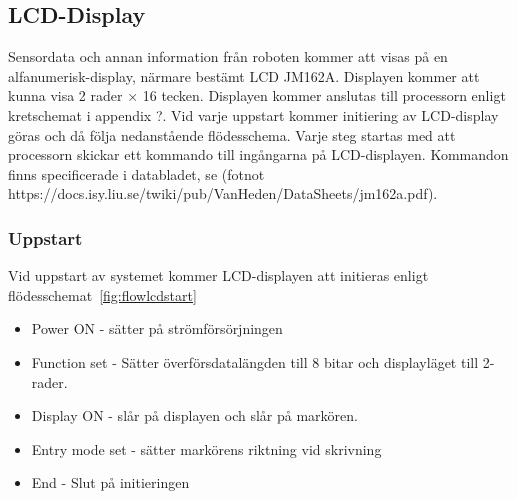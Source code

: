 \documentclass[a4paper,12pt,fleqn]{article}
\begin{document}
\subsection{LCD-Display}
Sensordata och annan information från roboten kommer att visas på en alfanumerisk-display, närmare bestämt  LCD JM162A. Displayen kommer att kunna visa 2 rader × 16 tecken.
Displayen kommer anslutas till processorn enligt kretschemat i appendix ?. 
Vid varje uppstart kommer initiering av LCD-display göras och då följa nedanstående flödesschema. Varje steg startas med att processorn skickar ett kommando till ingångarna på LCD-displayen. Kommandon finns specificerade i databladet, se (fotnot https://docs.isy.liu.se/twiki/pub/VanHeden/DataSheets/jm162a.pdf). 

\subsubsection{Uppstart}
	
Vid uppstart av systemet kommer LCD-displayen att initieras enligt flödes\-schemat~\ref{fig:flowlcdstart}

\begin{itemize}
  \item Power ON - sätter på strömförsörjningen
  \item Function set - Sätter överförsdatalängden till 8 bitar och displayläget till 2-rader.
  \item Display ON - slår på displayen och slår på markören. 
  \item Entry mode set - sätter markörens riktning vid skrivning
  \item End - Slut på initieringen
\end{itemize}
\end{document}

